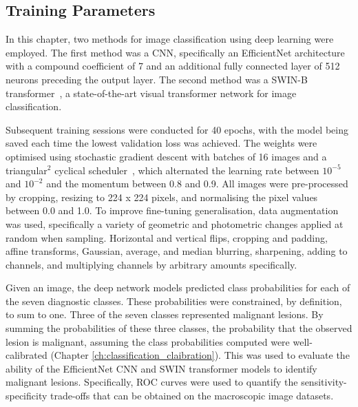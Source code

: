 \subsection{Training Parameters}
\label{subsec:generalisation_training}
In this chapter, two methods for image classification using deep learning were employed. The first method was a CNN, specifically an EfficientNet architecture~\citep{tan2019efficientnet} with a compound coefficient of 7 and an additional fully connected layer of 512 neurons preceding the output layer. The second method was a SWIN-B transformer~\citep{liu2021swin}, a state-of-the-art visual transformer network for image classification.

Subsequent training sessions were conducted for 40 epochs, with the model being saved each time the lowest validation loss was achieved. The weights were optimised using stochastic gradient descent with batches of 16 images and a triangular$^2$ cyclical scheduler~\citep{smith2017cyclical}, which alternated the learning rate between $10^{-5}$ and $10^{-2}$ and the momentum between 0.8 and 0.9. All images were pre-processed by cropping, resizing to 224 x 224 pixels, and normalising the pixel values between 0.0 and 1.0. To improve fine-tuning generalisation, data augmentation was used, specifically a variety of geometric and photometric changes applied at random when sampling. Horizontal and vertical flips, cropping and padding, affine transforms, Gaussian, average, and median blurring, sharpening, adding to channels, and multiplying channels by arbitrary amounts specifically.

Given an image, the deep network models predicted class probabilities for each of the seven diagnostic classes. These probabilities were constrained, by definition, to sum to one. Three of the seven classes represented malignant lesions. By summing the probabilities of these three classes, the probability that the observed lesion is malignant, assuming the class probabilities computed were well-calibrated (Chapter \ref{ch:classification_claibration}). This was used to evaluate the ability of the EfficientNet CNN and SWIN transformer models to identify malignant lesions. Specifically, ROC curves were used to quantify the sensitivity-specificity trade-offs that can be obtained on the macroscopic image datasets. 

